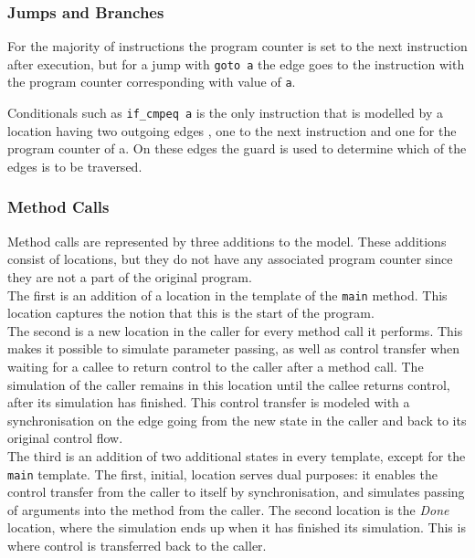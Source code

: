 \subsubsection{Jumps and Branches}
For the majority of instructions the program counter is set to the next instruction after execution, but for a jump with \texttt{goto a} the edge goes to the instruction with the program counter corresponding with value of \texttt{a}.

Conditionals such as \texttt{if\_cmpeq a} is the only instruction that is modelled by a location having two outgoing edges , one to the next instruction and one for the program counter of a. On these edges the guard is used to determine which of the edges is to be traversed. 
\subsubsection{Method Calls}\label{subsubsec:method}
Method calls are represented by three additions to the model. These additions consist of locations, but they do not have any associated program counter since they are not a part of the original program.\\

The first is an addition of a location in the template of the \texttt{main} method. This location captures the notion that this is the start of the program.\\

The second is a new location in the caller for every method call it performs. This makes it possible to simulate parameter passing, as well as control transfer when waiting for a callee to return control to the caller after a method call. The simulation of the caller remains in this location until the callee returns control, after its simulation has finished. This control transfer is modeled with a synchronisation on the edge going from the new state in the caller and back to its original control flow.~\\

The third is an addition of two additional states in every template, except for the \texttt{main} template. The first, initial, location serves dual purposes: it enables the control transfer from the caller to itself by synchronisation, and simulates passing of arguments into the method from the caller. The second location is the \textit{Done} location, where the simulation ends up when it has finished its simulation. This is where control is transferred back to the caller.
